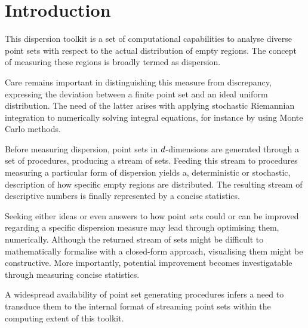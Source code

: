 \chapter{Introduction}

This dispersion toolkit is a set of computational capabilities to analyse diverse  point sets with respect to the actual distribution of empty regions. The concept of measuring these regions is broadly termed as dispersion.

Care remains important in distinguishing this measure from discrepancy, expressing the deviation between a finite point set and an ideal uniform distribution. The need of the latter arises with applying stochastic Riemannian integration to numerically solving integral equations, for instance by using Monte Carlo methods.

Before measuring dispersion, point sets in $d$-dimensions are generated through a set of procedures, producing a stream of sets. Feeding this stream to procedures measuring a particular form of dispersion yields a, deterministic or stochastic, description of how specific empty regions are distributed. The resulting stream of descriptive numbers is finally represented by a concise statistics.

Seeking either ideas or even answers to how point sets could or can be improved regarding a specific dispersion measure may lead through optimising them, numerically. Although the returned stream of sets might be difficult to mathematically formalise with a closed-form approach, visualising them might be constructive. More importantly, potential improvement becomes investigatable through measuring concise statistics.

A widespread availability of point set generating procedures infers a need to transduce them to the internal format of streaming point sets within the computing extent of this toolkit.
